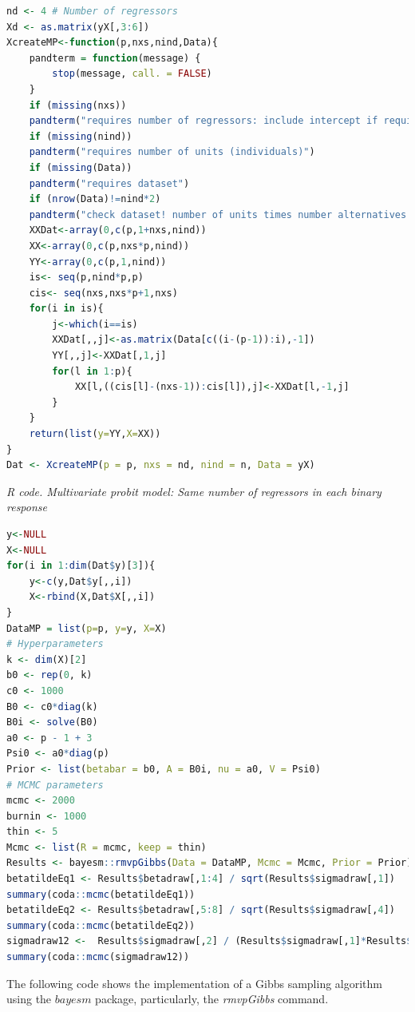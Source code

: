 \begin{enumerate}[leftmargin=*]
\begin{tcolorbox}[enhanced,width=4.67in,center upper,
	fontupper=\large\bfseries,drop shadow southwest,sharp corners]
\begin{VF}
\begin{lstlisting}[language=R]
nd <- 4 # Number of regressors
Xd <- as.matrix(yX[,3:6])
XcreateMP<-function(p,nxs,nind,Data){
	pandterm = function(message) {
		stop(message, call. = FALSE)
	}
	if (missing(nxs)) 
	pandterm("requires number of regressors: include intercept if required")
	if (missing(nind)) 
	pandterm("requires number of units (individuals)")
	if (missing(Data)) 
	pandterm("requires dataset")
	if (nrow(Data)!=nind*2)
	pandterm("check dataset! number of units times number alternatives should be equal to dataset rows")
	XXDat<-array(0,c(p,1+nxs,nind))
	XX<-array(0,c(p,nxs*p,nind))
	YY<-array(0,c(p,1,nind))
	is<- seq(p,nind*p,p)
	cis<- seq(nxs,nxs*p+1,nxs)
	for(i in is){
		j<-which(i==is)
		XXDat[,,j]<-as.matrix(Data[c((i-(p-1)):i),-1])
		YY[,,j]<-XXDat[,1,j]
		for(l in 1:p){
			XX[l,((cis[l]-(nxs-1)):cis[l]),j]<-XXDat[l,-1,j]
		}
	}
	return(list(y=YY,X=XX))
}
Dat <- XcreateMP(p = p, nxs = nd, nind = n, Data = yX)
\end{lstlisting}
	\end{VF}
\end{tcolorbox}

\begin{tcolorbox}[enhanced,width=4.67in,center upper,
	fontupper=\large\bfseries,drop shadow southwest,sharp corners]
	\textit{R code. Multivariate probit model: Same number of regressors in each binary response}
	\begin{VF}
		\begin{lstlisting}[language=R]
y<-NULL
X<-NULL
for(i in 1:dim(Dat$y)[3]){
	y<-c(y,Dat$y[,,i])
	X<-rbind(X,Dat$X[,,i])
}
DataMP = list(p=p, y=y, X=X)
# Hyperparameters
k <- dim(X)[2]
b0 <- rep(0, k)
c0 <- 1000
B0 <- c0*diag(k)
B0i <- solve(B0)
a0 <- p - 1 + 3
Psi0 <- a0*diag(p)
Prior <- list(betabar = b0, A = B0i, nu = a0, V = Psi0)
# MCMC parameters
mcmc <- 2000
burnin <- 1000
thin <- 5
Mcmc <- list(R = mcmc, keep = thin)
Results <- bayesm::rmvpGibbs(Data = DataMP, Mcmc = Mcmc, Prior = Prior)
betatildeEq1 <- Results$betadraw[,1:4] / sqrt(Results$sigmadraw[,1])
summary(coda::mcmc(betatildeEq1))
betatildeEq2 <- Results$betadraw[,5:8] / sqrt(Results$sigmadraw[,4])
summary(coda::mcmc(betatildeEq2))
sigmadraw12 <-  Results$sigmadraw[,2] / (Results$sigmadraw[,1]*Results$sigmadraw[,4])^0.5
summary(coda::mcmc(sigmadraw12))
\end{lstlisting}
	\end{VF}
\end{tcolorbox}

The following code shows the implementation of a Gibbs sampling algorithm using the $bayesm$ package, particularly, the \textit{rmvpGibbs} command.



\end{enumerate}
